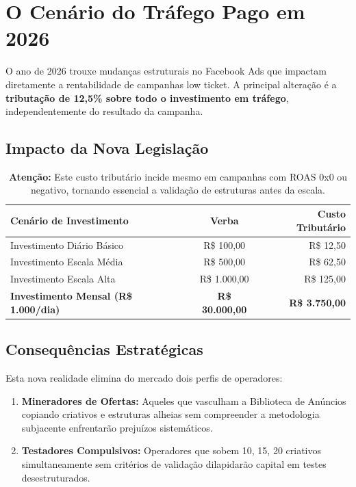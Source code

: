 \documentclass[12pt, a4paper]{article}
\newcommand{\reais}[1]{R\$ #1}
\begin{document}
\section{O Cenário do Tráfego Pago em 2026}

O ano de 2026 trouxe mudanças estruturais no Facebook Ads que impactam diretamente a rentabilidade de campanhas low ticket. A principal alteração é a \textbf{tributação de 12,5\% sobre todo o investimento em tráfego}, independentemente do resultado da campanha.

\subsection{Impacto da Nova Legislação}

\begin{table}[H]
    \centering
    \renewcommand{\arraystretch}{1.4}
    \begin{tabularx}{\textwidth}{X c r}
        \toprule
        \rowcolor{tableHeader} \textbf{Cenário de Investimento} & \textbf{Verba} & \textbf{Custo Tributário} \\
        \midrule
        Investimento Diário Básico & \reais{100,00} & \reais{12,50} \\
        Investimento Escala Média & \reais{500,00} & \reais{62,50} \\
        Investimento Escala Alta & \reais{1.000,00} & \reais{125,00} \\
        \midrule
        \rowcolor{accentColor!10} \textbf{Investimento Mensal (R\$ 1.000/dia)} & \textbf{\reais{30.000,00}} & \textbf{\reais{3.750,00}} \\
        \bottomrule
    \end{tabularx}
    \caption*{\footnotesize \textbf{Atenção:} Este custo tributário incide mesmo em campanhas com ROAS 0x0 ou negativo, tornando essencial a validação de estruturas antes da escala.}
\end{table}

\subsection{Consequências Estratégicas}

Esta nova realidade elimina do mercado dois perfis de operadores:

\begin{enumerate}
    \item \textbf{Mineradores de Ofertas:} Aqueles que vasculham a Biblioteca de Anúncios copiando criativos e estruturas alheias sem compreender a metodologia subjacente enfrentarão prejuízos sistemáticos.

    \item \textbf{Testadores Compulsivos:} Operadores que sobem 10, 15, 20 criativos simultaneamente sem critérios de validação dilapidarão capital em testes desestruturados.
\end{enumerate}
\end{document}
